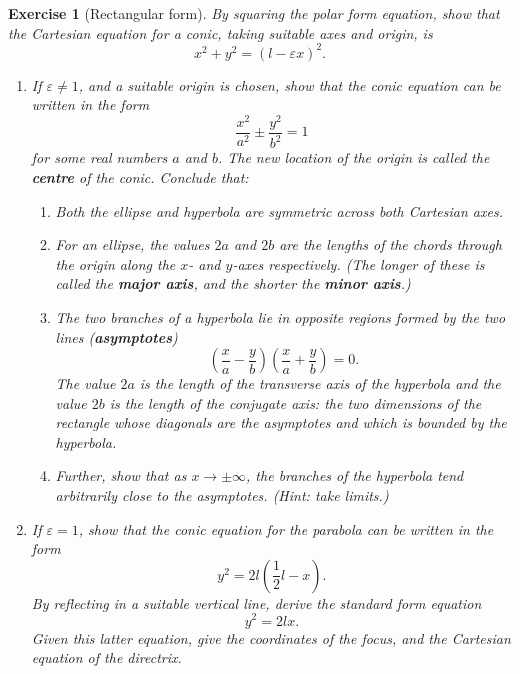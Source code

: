 \documentclass[a4paper,leqno,10pt]{article}
\theoremstyle{exercise}
\newtheorem{Exercise}{Exercise}
\newenvironment{exercise}
  {\begin{mdframed}\begin{Exercise}}
  {\end{Exercise}\end{mdframed}}
\theoremstyle{plain}
\theoremstyle{definition}
\theoremstyle{remark}
\newcommand{\df}{\textbf}
\begin{document}
\begin{exercise}[Rectangular form]\label{exercise:rectangular}
  By squaring the polar form equation, show that the Cartesian equation for a conic, taking suitable axes and origin, is
  \begin{displaymath}
    x^2 + y^2 = (l - \varepsilon x)^2.
  \end{displaymath}
  \begin{enumerate}
    \item If $ \varepsilon \neq 1 $, and a suitable origin is chosen, show that the conic equation can be written in the form
          \begin{displaymath}
            \frac{x^2}{a^2} \pm \frac{y^2}{b^2} = 1
          \end{displaymath}
          for some real numbers $ a $ and $ b $. The new location of the origin is called the \df{centre} of the conic. Conclude that:
          \begin{enumerate}
            \item Both the ellipse and hyperbola are symmetric across both Cartesian axes.
            \item For an ellipse, the values $ 2a $ and $ 2b $ are the lengths of the chords through the origin along the $ x$- and $ y$-axes respectively. (The
                  longer of these is called the \df{major axis}, and the shorter the \df{minor axis}.)
            \item The two branches of a hyperbola lie in opposite regions formed by the two lines (\df{asymptotes})
                    \begin{displaymath}
                      \left(\frac{x}{a} - \frac{y}{b} \right)\left(\frac{x}{a} + \frac{y}{b} \right) = 0.
                    \end{displaymath}
                    The value $ 2a $ is the length of the transverse axis of the hyperbola and the value $ 2b $ is the length of the conjugate
                    axis: the two dimensions of the rectangle whose diagonals are the asymptotes and which is bounded by the hyperbola.
            \item Further, show that as $ x \to \pm\infty $, the branches of the hyperbola tend arbitrarily close to the asymptotes. (Hint: take limits.)
          \end{enumerate}
    \item If $ \varepsilon = 1 $, show that the conic equation for the parabola can be written in the form
          \begin{displaymath}
            y^2 = 2l(\frac{1}{2}l - x).
          \end{displaymath}
          By reflecting in a suitable vertical line, derive the standard form equation
          \begin{displaymath}
            y^2 = 2lx.
          \end{displaymath}
          Given this latter equation, give the coordinates of the focus, and the Cartesian equation of the directrix.
  \end{enumerate}
\end{exercise}
\end{document}
